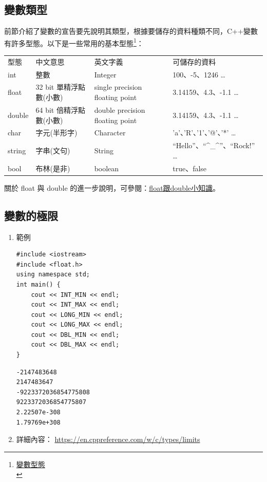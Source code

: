 \documentclass[a4paper,12pt]{article}
\begin{document}
\subsection{變數類型}
\label{cpp_variable_types}
前節介紹了變數的宣告要先說明其類型，根據要儲存的資料種類不同，C++變數有許多型態。以下是一些常用的基本型態\footnote{\href{https://www.csie.ntu.edu.tw/\~b98902112/cpp\_and\_algo/cpp/variable\_type\_and\_declare.html}{變數型態}\\}：\\
\begin{center}
\begin{tabular}{llll}
型態 & 中文意思 & 英文字義 & 可儲存的資料\\
int & 整數 & Integer & 100、-5、1246 \ldots{}\\
float & 32 bit 單精浮點數(小數) & single precision floating point & 3.14159、4.3、-1.1 \ldots{}\\
double & 64 bit 倍精浮點數(小數) & double precision floating point & 3.14159、4.3、-1.1 \ldots{}\\
char & 字元(半形字) & Character & 'a'、'R'、'1'、'@'、'*' \ldots{}\\
string & 字串(文句) & String & ``Hello''、``\^{}\_\^{}''、``Rock!'' \ldots{}\\
bool & 布林(是非) & boolean & true、false\\
\end{tabular}
\end{center}
關於 float 與 double 的進一步說明，可參閱：\href{https://taichunmin.pixnet.net/blog/post/27827769}{float跟double小知識}。\\

\subsection{變數的極限}
\label{sec:orgff90167}
\begin{enumerate}
\item 範例
\label{sec:org0c525c8}
\lstset{breaklines=true,language=cpp,label= ,caption= ,captionpos=b,firstnumber=1,numbers=left}
\begin{lstlisting}
#include <iostream>
#include <float.h>
using namespace std;
int main() {
    cout << INT_MIN << endl;
    cout << INT_MAX << endl;
    cout << LONG_MIN << endl;
    cout << LONG_MAX << endl;
    cout << DBL_MIN << endl;
    cout << DBL_MAX << endl;
}
\end{lstlisting}

\begin{verbatim}
-2147483648
2147483647
-9223372036854775808
9223372036854775807
2.22507e-308
1.79769e+308
\end{verbatim}

\item 詳細內容：
\label{sec:org1b0a1d1}
\url{https://en.cppreference.com/w/c/types/limits}\\
\end{enumerate}
\end{document}
